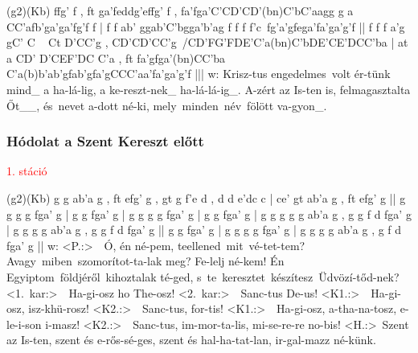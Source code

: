 \documentclass[twoside]{article}
\begin{document}

\begin{aretino}
(g2)(Kb) ffg' f , ft ga'feddg'effg' f , fa'fga'C'CD'CD'(bn)C'bC'aagg g a CC'afb'ga'ga'fg'f f | f f ab' ggab'C'bgga'b'ag f f f f'c~fg'a'gfega'fa'ga'g'f || f f f a'g gC' C ~ Ct D'CC'g , CD'CD'CC'g~/CD'FG'FDE'C'a(bn)C'bDE'CE'DCC'ba | at a CD' D'CEF'DC C'a , ft fa'gfga'(bn)CC'ba C'a(b)b'ab'gfab'gfa'gCCC'aa'fa'ga'g'f |||
w: Krisz-tus engedelmes~volt ér-tünk mind_ a ha-lá-lig, a ke-reszt-nek_ ha-lá-lá-ig_. A-zért az Is-ten is, felmagasztalta Őt__,  és~nevet a-dott né-ki, mely~minden~név~fölött va-gyon_.
\end{aretino}




\subsubsection*{Hódolat a Szent Kereszt előtt}



\textcolor{red}{1. stáció}

\begin{aretino}
(g2)(Kb) g g ab'a g , ft efg' g , gt g f'e d , d d e'dc c | ce' gt ab'a g , ft efg' g || g g g g fga' g | g g fga' g | g g g g fga' g | g g fga' g | g g g g g ab'a g , g g f d fga' g | g g g g ab'a g , g g f d fga' g || g g fga' g | g g g g fga' g | g g g g ab'a g , g f d fga' g ||
w: <P.:>~~Ó, én né-pem, teellened~mit~vé-tet-tem? Avagy~miben~szomorítot-ta-lak meg? Fe-lelj né-kem! Én Egyiptom~földjéről~kihoztalak té-ged, s~te~keresztet~készítesz~Üdvözí-tőd-nek? <1.~kar:>~~Ha-gi-osz ho The-osz! <2.~kar:>~~Sanc-tus De-us! <K1.:>~~Ha-gi-osz, isz-khü-rosz! <K2.:>~~Sanc-tus, for-tis! <K1.:>~~Ha-gi-osz, a-tha-na-tosz, e-le-i-son i-masz! <K2.:>~~Sanc-tus, im-mor-ta-lis, mi-se-re-re no-bis! <H.:>~Szent az Is-ten, szent és e-rős-sé-ges, szent és hal-ha-tat-lan, ir-gal-mazz né-künk.
\end{aretino}
\end{document}
